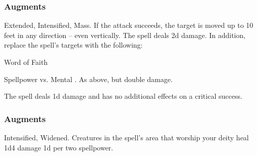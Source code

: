 \subsubsection{Augments}
 Extended, Intensified, Mass.
If the attack succeeds, the target is moved up to 10 feet in any direction -- even vertically.
The spell deals \minus2d damage.
In addition, replace
the spell's targets with the following:
\begin{augmenttargetinginfo}
\end{augmenttargetinginfo}
\begin{spellsection}{Word of Faith}
\begin{spellheader}
\end{spellheader}
\begin{spellcontent}
\begin{spelltargetinginfo}
\end{spelltargetinginfo}
\begin{spelleffects}
\begin{spellattack}{Spellpower vs. Mental}
\spellsuccess {}.
\spellcritical As above, but double damage.
\end{spellattack}
\end{spelleffects}
\end{spellcontent}
\begin{spellfooter}
\miscastexplode
\end{spellfooter}
\begin{spellcantrip}
The spell deals \minus1d damage and has no additional effects on a critical success.
\end{spellcantrip}
\end{spellsection}
\subsubsection{Augments}
 Intensified, Widened.
Creatures in the spell's area that worship your deity heal 1d4 damage \plus1d per two spellpower.